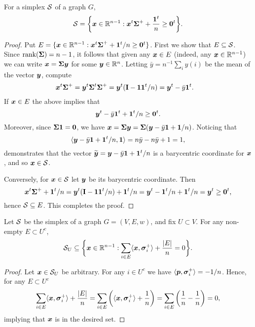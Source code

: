 \begin{lemma}
\label{lem:S_alt_desc}
For a simplex $\mathcal{S}$ of a graph $G$, 
\begin{equation}
\label{eq:S_alt_desc}
    \mathcal{S}=\bigg\{\vb*{x}\in \mathbb{R}^{n-1}:\vb*{x}^t\boldsymbol{\Sigma}^++\frac{\vb{1}^t}{n}\geq \vb{0}^t\bigg\}.
\end{equation}
\end{lemma}
\begin{proof}
Put $E=\{\vb*{x}\in \mathbb{R}^{n-1}:\vb*{x}^t\boldsymbol{\Sigma}^++\vb{1}^t/n\geq \vb{0}^t\}$. First we show that $E\subseteq\mathcal{S}$. 
Since $\rank(\boldsymbol{\Sigma})=n-1$, it follows that given any $\vb*{x}\in E$ (indeed, any $\vb*{x}\in\mathbb{R}^{n-1}$) we can write $\vb*{x}=\boldsymbol{\Sigma}\vb*{y}$ for some $\vb*{y}\in\mathbb{R}^n$. Letting $\bar{y}=n^{-1}\sum_i y(i)$ be the mean of the vector $\vb*{y}$, compute
\begin{align*}
    \vb*{x}^t\boldsymbol{\Sigma}^+ &= \vb*{y}^t \boldsymbol{\Sigma}^t\boldsymbol{\Sigma}^+ = \vb*{y}^t(\vb{I}-\vb{1}\vb{1}^t/n)=\vb*{y}^t - \bar{y}\vb{1}^t.
\end{align*}
If $\vb*{x}\in E$ the above implies that 
\[\vb*{y}^t-\bar{y}\vb{1}^t + \vb{1}^t/n\geq \vb{0}^t.\]
Moreover, since $\boldsymbol{\Sigma}\vb{1}=\vb{0}$, we have $\vb*{x}=\boldsymbol{\Sigma}\vb*{y}=\boldsymbol{\Sigma}(\vb*{y}-\bar{y}\vb{1} +\vb{1}/n)$. Noticing that 
\[\langle \vb*{y}-\bar{y}\vb{1}+\vb{1}^t/n,\vb{1}\rangle = n\bar{y}-n\bar{y}+1=1,\]
demonstrates that the vector $\widetilde{\vb*{y}}=\vb*{y}-\bar{y}\vb{1}+\vb{1}^t/n$ is a barycentric coordinate for $\vb*{x}$, and so $\vb*{x}\in \mathcal{S}$. 

Conversely, for $\vb*{x}\in\mathcal{S}$ let $\vb*{y}$ be its barycentric coordinate. Then 
\[\vb*{x}^t\boldsymbol{\Sigma}^++\vb{1}^t/n=\vb*{y}^t(\vb{I}-\vb{1}\vb{1}^t/n)+\vb{1}^t/n=\vb*{y}^t - \vb{1}^t/n+\vb{1}^t/n=\vb*{y}^t\geq \vb{0}^t, \]
hence $\mathcal{S}\subseteq E$. This completes the proof. 
\end{proof}

\begin{lemma}
\label{lem:SUsubset}
Let $\mathcal{S}$ be the simplex of a graph $G=(V,E,w)$, and fix $U\subset V$. For any non-empty $E\subset U^c$,
\begin{equation*}
    \mathcal{S}_U \subseteq \bigg\{\vb*{x}\in\mathbb{R}^{n-1}: \sum_{i\in E}\langle \vb*{x},\vb*{\sigma}_i^+\rangle +\frac{|E|}{n}=  0\bigg\}.
\end{equation*}
\end{lemma}
\begin{proof}
Let $\vb*{x}\in\mathcal{S}_U$ be arbitrary. For any $i\in U^c$ we have $\langle \vb*{p},\vb*{\sigma}_i^+\rangle = -1/n$. Hence, for any $E\subset U^c$
\[\sum_{i\in E}\langle \vb*{x},\vb*{\sigma}_i^+\rangle + \frac{|E|}{n} = \sum_{i\in E}\bigg(\langle \vb*{x},\vb*{\sigma}_i^+\rangle+\frac{1}{n}\bigg)=\sum_{i\in E}\bigg(\frac{1}{n}-\frac{1}{n}\bigg)=0,\]
implying that $\vb*{x}$ is in the desired set. 
\end{proof}


